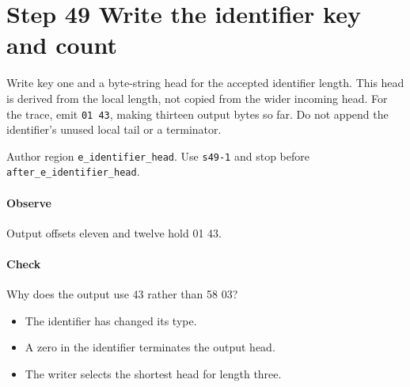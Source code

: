 \section{Step 49 Write the identifier key and count}\label{cbor-s49}
Write key one and a byte-string head for the accepted identifier length. This head is derived from the local length, not copied from the wider incoming head. For the trace, emit \texttt{01 43}, making thirteen output bytes so far. Do not append the identifier's unused local tail or a terminator.

Author region \texttt{e\_identifier\_head}. Use \texttt{s49-1} and stop before \texttt{after\_e\_identifier\_head}.

\paragraph{Observe} Output offsets eleven and twelve hold 01 43.

\paragraph{Check} Why does the output use 43 rather than 58 03?
\begin{itemize}
\item[A.] The identifier has changed its type.
\item[B.] A zero in the identifier terminates the output head.
\item[C.] The writer selects the shortest head for length three.
\end{itemize}
